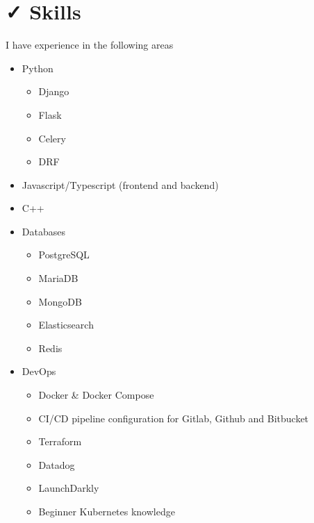 \documentclass{resume}
\begin{document}
\section{{\faCheck} Skills}
I have experience in the following areas \\
\bigskip
\begin{minipage}[t]{0.3\textwidth}
  \begin{itemize}
    \item Python
    \begin{itemize}
      \item Django
      \item Flask
      \item Celery
      \item DRF
    \end{itemize}
    \item Javascript/Typescript (frontend and backend)
    \item C++
  \end{itemize}
\end{minipage}
\begin{minipage}[t]{0.3\textwidth}
  \begin{itemize}
    \item Databases
    \begin{itemize}
      \item PostgreSQL
      \item MariaDB
      \item MongoDB
      \item Elasticsearch
      \item Redis
    \end{itemize}
    \item DevOps
    \begin{itemize}
      \item Docker \& Docker Compose
      \item CI/CD pipeline configuration for Gitlab, Github and Bitbucket
      \item Terraform
      \item Datadog
      \item LaunchDarkly
      \item Beginner Kubernetes knowledge
    \end{itemize}
  \end{itemize}
\end{minipage}
\end{document}
